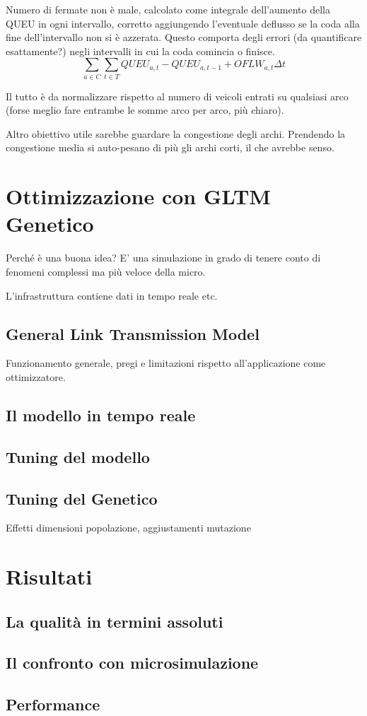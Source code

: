 \documentclass[10pt,a4paper,twoside]{book}
\begin{document}
Numero di fermate non è male, calcolato come integrale dell'aumento della QUEU in ogni intervallo, corretto aggiungendo l'eventuale deflusso se la coda alla fine dell'intervallo non si è azzerata.
Questo comporta degli errori (da quantificare esattamente?) negli intervalli in cui la coda comincia o finisce.
$$
\sum_{a \in C} \sum_{t \in T} QUEU_{a,t} - QUEU_{a,t-1} + OFLW_{a,t} \Delta t
$$


Il tutto è da normalizzare rispetto al numero di veicoli entrati su qualsiasi arco (forse meglio fare entrambe le somme arco per arco, più chiaro).

Altro obiettivo utile sarebbe guardare la congestione degli archi.
Prendendo la congestione media si auto-pesano di più gli archi corti, il che avrebbe senso.

\chapter{Ottimizzazione con GLTM Genetico}
Perché è una buona idea?
E' una simulazione in grado di tenere conto di fenomeni complessi ma più veloce della micro.

L'infrastruttura contiene dati in tempo reale etc.

\section{General Link Transmission Model}
Funzionamento generale, pregi e limitazioni rispetto all'applicazione come ottimizzatore.


\section{Il modello in tempo reale}

\section{Tuning del modello}


\section{Tuning del Genetico}
Effetti dimensioni popolazione, aggiustamenti mutazione

\chapter{Risultati}
\section{La qualità in termini assoluti}


\section{Il confronto con microsimulazione}


\section{Performance}
\end{document}
